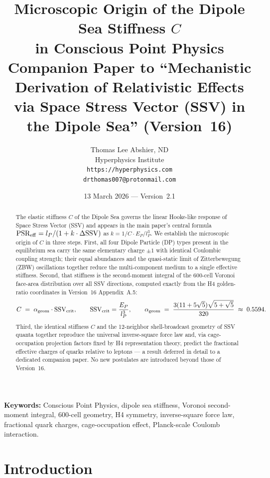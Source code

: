 \documentclass[12pt]{article}
\title{\textbf{Microscopic Origin of the Dipole Sea Stiffness \boldmath$C$\\
in Conscious Point Physics}\\[6pt]
{\large Companion Paper to ``Mechanistic Derivation of Relativistic Effects\\
via Space Stress Vector (SSV) in the Dipole Sea'' (Version~16)}}
\author{Thomas Lee Abshier, ND\\
Hyperphysics Institute\\
\texttt{https://hyperphysics.com}\\
\texttt{drthomas007@protonmail.com}}
\date{13 March 2026 --- Version~2.1}
\newcommand{\lP}{l_P}
\newcommand{\EP}{E_P}
\newcommand{\SSV}{\text{SSV}}
\newcommand{\PSR}{\text{PSR}}
\newcommand{\alphageom}{\alpha_{\rm geom}}
\newcommand{\SSVcrit}{\SSV_{\rm crit}}
\begin{document}
\maketitle

\noindent\textbf{Keywords:} Conscious Point Physics, dipole sea stiffness,
Voronoi second-moment integral, 600-cell geometry, H4 symmetry,
inverse-square force law, fractional quark charges, cage-occupation effect,
Planck-scale Coulomb interaction.

\begin{abstract}
The elastic stiffness $C$ of the Dipole Sea governs the linear Hooke-like
response of Space Stress Vector (SSV) and appears in the main paper's central
formula $\PSR_{\rm eff} = \lP/(1 + k\cdot\Delta\SSV)$ as $k = 1/C\cdot\EP/\lP^3$.
We establish the microscopic origin of $C$ in three steps.  First, all four
Dipole Particle (DP) types present in the equilibrium sea carry the same
elementary charge $\pm 1$ with identical Coulombic coupling strength; their
equal abundances and the quasi-static limit of Zitterbewegung (ZBW)
oscillations together reduce the multi-component medium to a single effective
stiffness.  Second, that stiffness is the second-moment integral of the
600-cell Voronoi face-area distribution over all SSV directions, computed
exactly from the H4 golden-ratio coordinates in Version~16 Appendix~A.5:
\[
  C \;=\; \alphageom \cdot \SSVcrit,\qquad
  \SSVcrit = \frac{\EP}{\lP^3},\qquad
  \alphageom \;=\; \frac{3(11+5\sqrt{5})\sqrt{5+\sqrt{5}}}{320}
  \;\approx\; 0.5594.
\]
Third, the identical stiffness $C$ and the 12-neighbor shell-broadcast
geometry of SSV quanta together reproduce the universal inverse-square force
law and, via cage-occupation projection factors fixed by H4 representation
theory, predict the fractional effective charges of quarks relative to
leptons --- a result deferred in detail to a dedicated companion paper.
No new postulates are introduced beyond those of Version~16.
\end{abstract}

\section{Introduction}
\label{sec:intro}
\end{document}
